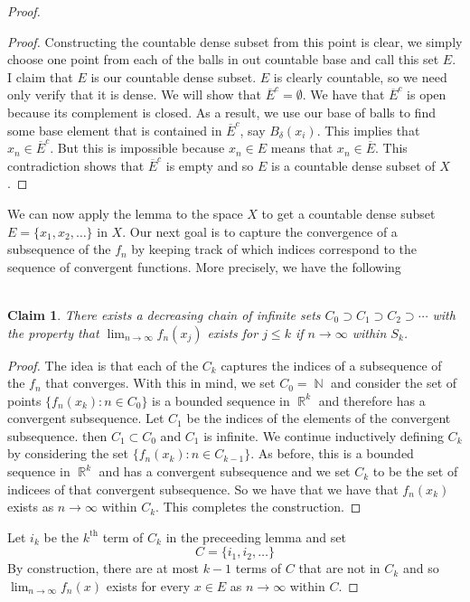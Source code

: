 \documentclass{article}
\DeclareMathOperator{\N}{\mathbb{N}}
\DeclareMathOperator{\R}{\mathbb{R}}
\DeclareMathOperator{\suchthat}{\mathrel{:}}
\newtheorem*{claim}{\\ Claim}
\begin{document}
\begin{proof}
\begin{proof}
    Constructing the countable dense subset from this point is clear,
    we simply choose one point from each of the balls in out countable
    base and call this set $E$. I claim that $E$ is our countable
    dense subset. $E$ is clearly countable, so we need only verify
    that it is dense. We will show that $\overline{E}^c =
    \emptyset$. We have that $\overline{E}^c$ is open because its
    complement is closed. As a result, we use our base of balls to
    find some base element that is contained in $\overline{E}^c$, say
    $B_\delta(x_i)$. This implies that $x_n \in \overline{E}^c$. But
    this is impossible because $x_n \in E$ means that $x_n \in
    \overline{E}$. This contradiction shows that $\overline{E}^c$ is
    empty and so $E$ is a countable dense subset of $X$.
  \end{proof}
  We can now apply the lemma to the space $X$ to get a countable dense
  subset $E = \{x_1,x_2,\ldots\}$ in $X$. Our next goal is to capture
  the convergence of a subsequence of the $f_n$ by keeping track of
  which indices correspond to the sequence of convergent
  functions. More precisely, we have the following
  \begin{claim}
    There exists a decreasing chain of infinite sets $C_0 \supset C_1
    \supset C_2 \supset \cdots$ with the property that
    $\lim_{n\to\infty} f_n(x_j)$ exists for $j \leq k$ if $n \to
    \infty$ within $S_k$.
  \end{claim}
  \begin{proof}
    The idea is that each of the $C_k$ captures the indices of a
    subsequence of the $f_n$ that converges. With this in mind, we set
    $C_0 = \N$ and consider the set of points $\{f_n(x_k) \suchthat n
    \in C_0\}$ is a bounded sequence in $\R^k$ and therefore has a
    convergent subsequence. Let $C_1$ be the indices of the elements
    of the convergent subsequence. then $C_1 \subset C_0$ and $C_1$ is
    infinite. We continue inductively defining $C_k$ by considering
    the set $\{f_n(x_k) \suchthat n \in C_{k-1}\}$. As before, this is
    a bounded sequence in $\R^k$ and has a convergent subsequence and
    we set $C_k$ to be the set of indicees of that convergent
    subsequence. So we have that we have that $f_n(x_k)$ exists as
    $n\to\infty$ within $C_k$. This completes the construction.
  \end{proof}
  Let $i_k$ be the $k^{\text{th}}$ term of $C_k$ in the preceeding
  lemma and set
  \[
  C = \{i_1, i_2, \ldots\}
  \]
  By construction, there are at most $k-1$ terms of $C$ that are not
  in $C_k$ and so $\lim_{n\to\infty} f_n(x)$ exists for every $x\in E$
  as $n\to\infty$ within $C$.


\end{proof}
\end{document}
